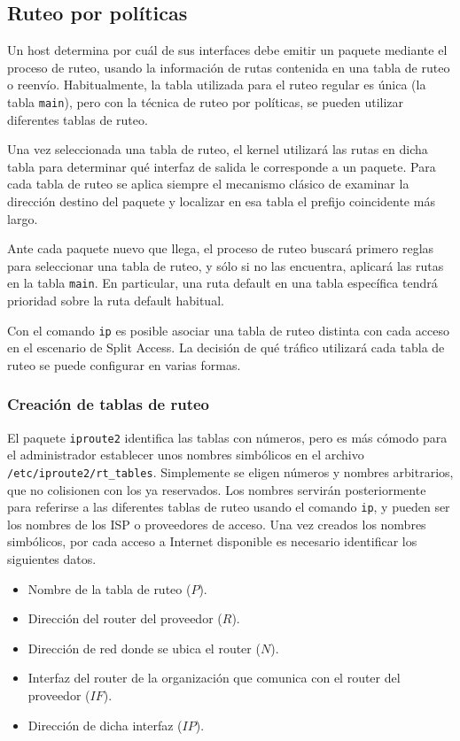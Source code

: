  

\subsection{Ruteo por políticas}
Un host determina por cuál de sus interfaces debe emitir un paquete mediante el proceso de ruteo, usando la información de rutas contenida en una tabla de ruteo o reenvío. Habitualmente, la tabla utilizada para el ruteo regular es única (la tabla \texttt{main}), pero con la técnica de ruteo por políticas, se pueden utilizar diferentes tablas de ruteo. 

Una vez seleccionada una tabla de ruteo, el kernel utilizará las rutas en dicha tabla para determinar qué interfaz de salida le corresponde a un paquete. Para cada tabla de ruteo se aplica siempre el mecanismo clásico de examinar la dirección destino del paquete y localizar en esa tabla el prefijo coincidente más largo. 

Ante cada paquete nuevo que llega, el proceso de ruteo buscará primero reglas para seleccionar una tabla de ruteo, y sólo si no las encuentra, aplicará las rutas en la tabla \texttt{main}. En particular, una ruta default en una tabla específica tendrá prioridad sobre la ruta default habitual. 

Con el comando \texttt{ip} es posible asociar una tabla de ruteo distinta con cada acceso en el escenario de Split Access. La decisión de qué tráfico utilizará cada tabla de ruteo se puede configurar en varias formas. 

\subsubsection{Creación de tablas de ruteo}
El paquete \texttt{iproute2} identifica las tablas con números, pero es más cómodo para el administrador establecer unos nombres simbólicos en el archivo \texttt{/etc/iproute2/rt\_tables}. Simplemente se eligen números y nombres arbitrarios, que no colisionen con los ya reservados. Los nombres servirán posteriormente para referirse a las diferentes tablas de ruteo usando el comando \texttt{ip}, y pueden ser los nombres de los ISP o proveedores de acceso. Una vez creados los nombres simbólicos, por cada acceso a Internet disponible es necesario identificar los siguientes datos.
\begin{itemize}
	\item Nombre de la tabla de ruteo ($P$).
	\item Dirección del router del proveedor ($R$).
	\item Dirección de red donde se ubica el router ($N$).
	\item Interfaz del router de la organización que comunica con el router del proveedor ($IF$).
	\item Dirección de dicha interfaz ($IP$).
\end{itemize}

